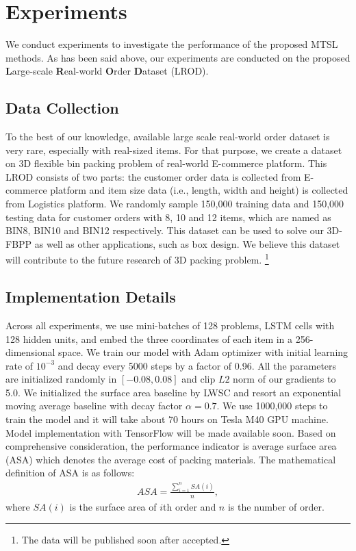 \section{Experiments}
\label{sec:exp}
We conduct experiments to investigate the performance of the proposed MTSL 
methods. As has been said above, our experiments are conducted on the 
proposed \textbf{L}arge-scale \textbf{R}eal-world \textbf{O}rder 
\textbf{D}ataset (LROD). 

\subsection{Data Collection}
\label{sec:data}
To the best of our knowledge, available large scale real-world order dataset is very rare, especially with real-sized items. For that purpose, we create a dataset on 3D flexible bin packing problem of real-world E-commerce platform. This LROD consists of two parts: the customer order data is collected from E-commerce platform and item size data (i.e., length, width and height) is collected from Logistics platform. We randomly sample 150,000 training data and 150,000 testing data for customer orders with 8, 10 and 12 items, which are named as BIN8, BIN10 and BIN12 respectively. This dataset can be used to solve our 3D-FBPP as well as other applications, such as box design. We believe this dataset will contribute to the future research of 3D packing problem. \footnote{The data will be published soon after accepted.}

\subsection{Implementation Details}
\label{sec:implementation}
Across all experiments, we use mini-batches of 128 problems, LSTM cells with 128 hidden units, and embed the three coordinates of each item in a 256-dimensional space. We train our model with Adam optimizer \cite{kingma2014adam} with initial learning rate of $10^{-3}$ and decay every 5000 steps by a factor of 0.96. All the parameters are initialized randomly in $[-0.08,0.08]$ and clip $L2$ norm of our gradients to 5.0. We initialized the surface area baseline by LWSC and resort an exponential moving average  baseline with decay factor $\alpha=0.7$. We use 1000,000 steps to train the model and it will take about 70 hours on Tesla M40 GPU machine. Model implementation with TensorFlow will be made available soon.
Based on comprehensive consideration, the performance indicator is average surface area (ASA) which denotes the average cost of packing materials. The mathematical definition of ASA is as follows:
\begin{eqnarray*}
	ASA = \frac{\sum_{i=1}^{n} SA(i)}{n},
\end{eqnarray*}
where $SA(i)$ is the surface area of $i$th order and $n$ is the number of order.

